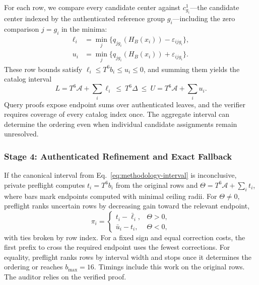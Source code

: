 \documentclass[5p,times,twocolumn]{elsarticle}
\begin{document}
For each row, we compare every candidate center against $c^1_{g_i}$—the candidate center indexed by the authenticated reference group $g_i$—including the zero comparison $j=g_i$ in the minima:
\begin{align}
 \ell_i&=\min_j\{q_{jg_i}(H_B(x_i))-\varepsilon_{ijg_i}\},\nonumber\\
 u_i&=\min_j\{q_{jg_i}(H_B(x_i))+\varepsilon_{ijg_i}\}.
 \label{eq:methodology-row-bounds}
\end{align}
These row bounds satisfy $\ell_i\leq T^6b_i\leq u_i\leq0$, and summing them yields the catalog interval
\begin{equation}
 L=T^6\mathcal A+\sum_i\ell_i
 \ \leq\ T^6\Delta\ \leq\
 U=T^6\mathcal A+\sum_i u_i.
 \label{eq:methodology-interval}
\end{equation}
Query proofs expose endpoint sums over authenticated leaves, and the verifier requires coverage of every catalog index once. The aggregate interval can determine the ordering even when individual candidate assignments remain unresolved.

\subsubsection{Stage 4: Authenticated Refinement and Exact Fallback}
\label{sec:methodology-refinement}
If the canonical interval from Eq.~\eqref{eq:methodology-interval} is inconclusive, private preflight computes $t_i=T^6b_i$ from the original rows and $\Theta=T^6\mathcal A+\sum_i t_i$, where bars mark endpoints computed with minimal ceiling radii. For $\Theta\ne0$, preflight ranks uncertain rows by decreasing gain toward the relevant endpoint,
\begin{equation}
 \pi_i=\begin{cases}
 t_i-\bar\ell_i,&\Theta>0,\\
 \bar u_i-t_i,&\Theta<0,
 \end{cases}
 \label{eq:methodology-endpoint-gain}
\end{equation}
with ties broken by row index. For a fixed sign and equal correction
costs, the first prefix to cross the required endpoint uses the fewest
corrections. For equality, preflight ranks rows by interval width and
stops once it determines the ordering or reaches $b_{\max}=16$.
Timings include this work on the original rows. The auditor relies on
the verified proof.
\end{document}
